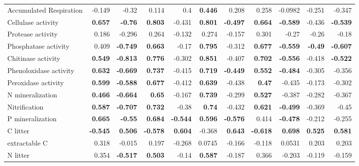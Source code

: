 \documentclass[10pt]{article}
\begin{document}
\begin{flushleft}
\begin{landscape}
\begin{table}[h!]
{\begin{tabular}{lrrrrrrrrrr}
  Accumulated Respiration & -0.149 & -0.32 & 0.114 &  0.4 & \textbf{ 0.446 } & 0.208 & 0.258 & -0.0982 & -0.251 & -0.347 \\ 
  Cellulase activity & \textbf{ 0.657 } & \textbf{ -0.76 } & \textbf{ 0.803 } & -0.431 & \textbf{ 0.801 } & \textbf{ -0.497 } & \textbf{ 0.664 } & \textbf{ -0.589 } & -0.436 & \textbf{ -0.539 } \\ 
  Protease activity & 0.186 & -0.296 & 0.264 & -0.132 & 0.274 & -0.157 & 0.301 & -0.27 & -0.26 & -0.18 \\ 
  Phosphatase activity & 0.409 & \textbf{ -0.749 } & \textbf{ 0.663 } & -0.17 & \textbf{ 0.795 } & -0.312 & \textbf{ 0.677 } & \textbf{ -0.559 } & \textbf{ -0.49 } & \textbf{ -0.607 } \\ 
  Chitinase activity & \textbf{ 0.549 } & \textbf{ -0.813 } & \textbf{ 0.776 } & -0.302 & \textbf{ 0.851 } & -0.407 & \textbf{ 0.702 } & \textbf{ -0.556 } & -0.418 & \textbf{ -0.522 } \\ 
  Phenoloxidase activity & \textbf{ 0.632 } & \textbf{ -0.669 } & \textbf{ 0.737 } & -0.415 & \textbf{ 0.719 } & \textbf{ -0.449 } & \textbf{ 0.552 } & \textbf{ -0.484 } & -0.305 & -0.356 \\ 
  Peroxidase activity & \textbf{ 0.599 } & \textbf{ -0.588 } & \textbf{ 0.677 } & -0.412 & \textbf{ 0.639 } & -0.438 & \textbf{ 0.47 } & -0.435 & -0.173 & -0.302 \\ 
  N mineralization & \textbf{ 0.466 } & \textbf{ -0.664 } & \textbf{ 0.65 } & -0.167 & \textbf{ 0.739 } & -0.299 & \textbf{ 0.527 } & -0.387 & -0.282 & -0.367 \\ 
  Nitrification & \textbf{ 0.587 } & \textbf{ -0.707 } & \textbf{ 0.732 } & -0.38 & \textbf{ 0.74 } & -0.432 & \textbf{ 0.621 } & \textbf{ -0.499 } & -0.369 & -0.45 \\ 
  P mineralization & \textbf{ 0.665 } & \textbf{ -0.55 } & \textbf{ 0.684 } & \textbf{ -0.544 } & \textbf{ 0.596 } & \textbf{ -0.576 } & 0.414 & \textbf{ -0.478 } & -0.212 & -0.255 \\ 
  C litter & \textbf{ -0.545 } & \textbf{ 0.506 } & \textbf{ -0.578 } & \textbf{ 0.604 } & -0.368 & \textbf{ 0.643 } & \textbf{ -0.618 } & \textbf{ 0.698 } & \textbf{ 0.525 } & \textbf{ 0.581 } \\ 
  extractable C & 0.318 & -0.015 & 0.197 & -0.268 & 0.0745 & -0.166 & -0.118 & 0.0531 & 0.203 & 0.203 \\ 
  N litter & 0.354 & \textbf{ -0.517 } & \textbf{ 0.503 } & -0.14 & \textbf{ 0.587 } & -0.187 & 0.366 & -0.203 & -0.119 & -0.159 \\ 

\end{tabular}}
\end{table}
\end{landscape}
\end{flushleft}
\end{document}
